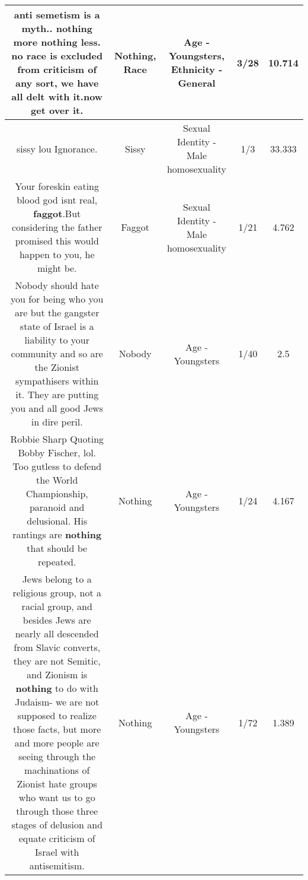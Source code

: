 \documentclass[11pt]{article}
\newlength\mylength
\begin{document}
\begin{center}
\begin{longtable}{|C{.65\mylength}|C{.30\mylength}|C{.12\mylength}|C{.12\mylength}|C{.12\mylength}|}
  \small anti semetism is a myth.. \textbf{nothing} more \textbf{nothing} less. no \textbf{race} is excluded from criticism of any sort, we have all delt with it.now get over it.\normalsize   & Nothing, Race & Age - Youngsters, Ethnicity - General & 3/28 & 10.714 \\  \hline
  \small sissy lou Ignorance.\normalsize   & Sissy & Sexual Identity - Male homosexuality & 1/3 & 33.333 \\  \hline
  \small Your foreskin eating blood god isnt real, \textbf{faggot}.But considering the father promised this would happen to you, he might be.\normalsize   & Faggot & Sexual Identity - Male homosexuality & 1/21 & 4.762 \\  \hline
  \small Nobody should hate you for being who you are but the gangster state of Israel is a liability to your community and so are the Zionist sympathisers within it. They are putting you and all good Jews in dire peril.\normalsize   & Nobody & Age - Youngsters & 1/40 & 2.5 \\  \hline
  \small Robbie Sharp Quoting Bobby Fischer, lol.  Too gutless to defend the World Championship, paranoid and delusional.  His rantings are \textbf{nothing} that should be repeated.\normalsize   & Nothing & Age - Youngsters & 1/24 & 4.167 \\  \hline
  \small Jews belong to a religious group, not a racial group, and besides Jews are nearly all descended from Slavic converts, they are not Semitic, and Zionism is \textbf{nothing} to do with Judaism-  we are not supposed to realize those facts, but more and more people are seeing through the machinations of Zionist hate groups who want us to go through those three stages of delusion and equate criticism of Israel with antisemitism.\normalsize   & Nothing & Age - Youngsters & 1/72 & 1.389 \\  \hline

\end{longtable}
\end{center}
\end{document}
